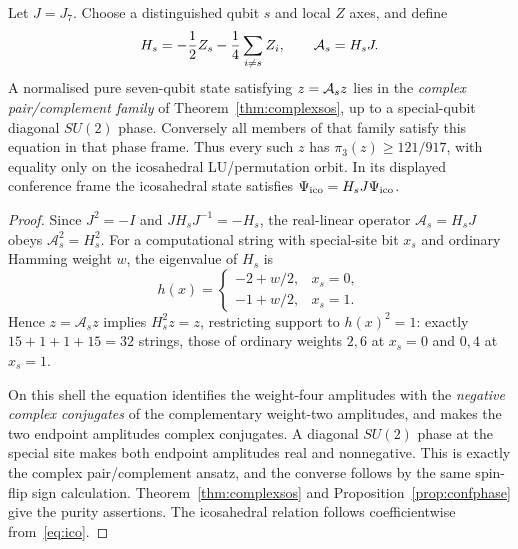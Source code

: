 \begin{proposition}
\label{prop:kramers-conference-shell}
Let $J=J_7$. Choose a distinguished qubit $s$
and local $Z$ axes, and define
\[
 H_s=-\frac12Z_s-\frac14\sum_{i\ne s}Z_i,
 \qquad {\cal A}_s=H_sJ.
\]
A normalised pure seven-qubit state satisfying
$z={\cal A}_sz$ lies in the \emph{complex
pair/complement family} of
Theorem~\ref{thm:complexsos},
up to a special-qubit diagonal $SU(2)$ phase.
Conversely all members of that family
satisfy this equation in that phase frame.
Thus every such $z$ has $\pi_3(z)\ge121/917$, with equality
only on the icosahedral LU/permutation orbit.
In its displayed conference frame the
icosahedral state satisfies
$\Psi_{\mathrm{ico}}=H_sJ\Psi_{\mathrm{ico}}$.
\end{proposition}
\begin{proof}
Since $J^2=-I$ and $JH_sJ^{-1}=-H_s$,
the real-linear operator $\mathcal A_s=H_sJ$
obeys $\mathcal A_s^2=H_s^2$.
For a computational string with
special-site bit $x_s$ and ordinary
Hamming weight $w$, the eigenvalue
of $H_s$ is
\[
 h(x)=\begin{cases}
 -2+w/2,&x_s=0,\\
 -1+w/2,&x_s=1.
 \end{cases}
\]
Hence $z=\mathcal A_sz$ implies $H_s^2z=z$,
restricting support to $h(x)^2=1$:
exactly $15+1+1+15=32$ strings, those of
ordinary weights $2,6$ at $x_s=0$ and $0,4$ at $x_s=1$.

On this shell the equation identifies the
weight-four amplitudes with the
\emph{negative complex conjugates}
of the complementary weight-two amplitudes,
and makes the two endpoint amplitudes complex conjugates.
A diagonal $SU(2)$ phase at the special site
makes both endpoint amplitudes real and
nonnegative. This is exactly the complex
pair/complement ansatz, and the converse
follows by the same spin-flip sign calculation.
Theorem~\ref{thm:complexsos} and
Proposition~\ref{prop:confphase} give the purity
assertions. The icosahedral relation follows
coefficientwise from~\eqref{eq:ico}.
\end{proof}
